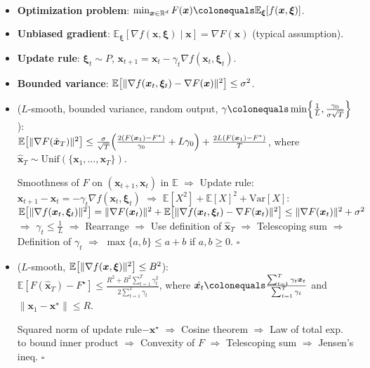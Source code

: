 \documentclass[8pt,a4paper]{extarticle}
\renewcommand{\proof}[1]{\begin{tcolorbox}#1 \hfill $\square$\end{tcolorbox}}
\newcommand{\lft}{\mathopen{}\mathclose\bgroup\left}
\newcommand{\rgt}{\aftergroup\egroup\right}
\newcommand{\E}{\mathbb{E}}
\newcommand{\R}{\mathbb{R}}
\newcommand{\Var}{\mathrm{Var}}
\renewcommand{\vec}[1]{\bm{#1}}
\newenvironment{topic}[1]
{\textbf{\sffamily \colorbox{black}{\rlap{\textbf{\textcolor{white}{#1}}}\hspace{\linewidth}\hspace{-2\fboxsep}}} \\ \vspace{0.2cm}}
{}
\begin{document}
\begin{multicols*}{2}
    \begin{topic}{Stochastic optimization}
        \begin{itemize}
            \item \textbf{Optimization problem}: $\min_{\vec{x} \in \R^d} F(\vec{x}) \colonequals \E_{\vec{\xi}}[f(\vec{x},
                          \vec{\xi})]$.
            \item \textbf{Unbiased gradient}: $\E_{\vec{\xi}}[\nabla f(\vec{x}, \vec{\xi}) \mid \vec{x}] = \nabla F(\vec{x})$ (typical assumption).
            \item \textbf{Update rule}: $\vec{\xi}_t \sim P$, $\vec{x}_{t+1} = \vec{x}_t - \gamma_t \nabla f(\vec{x}_t, \vec{\xi}_t)$.
            \item \textbf{Bounded variance}: $\E \lft[ \| \nabla f(\vec{x}_t, \vec{\xi}_t) - \nabla F(\vec{x}) \|^2 \rgt] \leq \sigma^2$.
            \item ($L$-smooth, bounded variance, random output, $\gamma \colonequals \min \lft\{ \frac{1}{L}, \frac{\gamma_0}{\sigma \sqrt{T}} \rgt\}$): \\
                  $\E \lft[ \| \nabla F(\hat{\vec{x}}_T) \|^2 \rgt] \leq \frac{\sigma}{\sqrt{T}} \lft( \frac{2(F(\vec{x}_1) - F^\star)}{\gamma_0} + L \gamma_0 \rgt) + \frac{2L(F(\vec{x}_1) - F^\star)}{T}$, where $\hat{\vec{x}}_T \sim \mathrm{Unif}(\{ \vec{x}_1, \ldots, \vec{x}_T \})$.
                  \proof{Smoothness of $F$ on $(\vec{x}_{t+1}, \vec{x}_t)$ in $\E$ $\Rightarrow$ Update rule: $\vec{x}_{t+1} - \vec{x}_t = -\gamma_t \nabla f(\vec{x}_t, \vec{\xi}_t)$ $\Rightarrow$ $\E[X^2] + \E[X]^2 + \Var[X]$: $\E \lft[ \| \nabla f(\vec{x}_t, \vec{\xi}_t) \|^2 \rgt] = \| \nabla F(\vec{x}_t) \|^2 + \E \lft[ \| \nabla f(\vec{x}_t, \vec{\xi}_t) - \nabla F(\vec{x}_t) \|^2 \rgt] \leq \| \nabla F(\vec{x}_t) \|^2 + \sigma^2$ $\Rightarrow$ $\gamma_t \leq \frac{1}{L}$ $\Rightarrow$ Rearrange $\Rightarrow$ Use definition of $\hat{\vec{x}}_T$ $\Rightarrow$ Telescoping sum $\Rightarrow$ Definition of $\gamma_t$ $\Rightarrow$ $\max \{ a,b \} \leq a + b$ if $a,b \geq 0$.}
            \item ($L$-smooth, $\E \lft[ \| \nabla f(\vec{x}, \vec{\xi}) \|^2 \rgt] \leq B^2$): \\
                  $\E[F(\hat{\vec{x}}_T) - F^\star] \leq \frac{R^2 + B^2 \sum_{t=1}^{T} \gamma_t^2}{2 \sum_{t=1}^{T} \gamma_t}$, where $\hat{\vec{x}_t} \colonequals \frac{\sum_{t=1}^{T} \gamma_t \vec{x}_t}{\sum_{t=1}^{T} \gamma_t}$ and $\| \vec{x}_1 - \vec{x}^\star \| \leq R$.
                  \proof{Squared norm of update rule$-\vec{x}^\star$ $\Rightarrow$ Cosine theorem $\Rightarrow$ Law of total exp. to bound inner product $\Rightarrow$ Convexity of $F$ $\Rightarrow$ Telescoping sum $\Rightarrow$ Jensen's ineq.}

\end{itemize}
\end{topic}
\end{multicols*}
\end{document}
